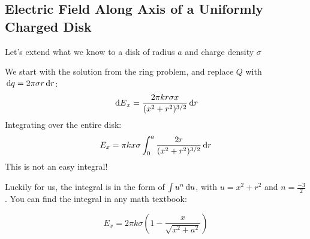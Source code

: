 \subsection{Electric Field Along Axis of a Uniformly Charged Disk}
Let's extend what we know to a disk of radius $a$ and charge density $\sigma$
\begin{center}
\end{center}
  
We start with the solution from the ring problem, and replace $Q$ with
$\dl q=2\pi\sigma r\dl r$:
\begin{equation}
  \dl E_x =\frac{2\pi kr\sigma x}{(x^2+r^2)^{3/2}}\dl r
\end{equation}
Integrating over the entire disk:
\begin{equation}
  E_x =\pi kx\sigma\int_0^a\frac{2r}{(x^2+r^2)^{3/2}}\dl r
\end{equation}
This is not an easy integral!

Luckily for us, the integral is in the form of $\int u^n\dl u$,
with $u=x^2+r^2$ and $n=\frac{-3}2$. You can find the integral in any math
textbook:

\begin{equation}
  E_x =2\pi k\sigma\left(1-\frac x{\sqrt{x^2+a^2}}\right)
\end{equation}
  

